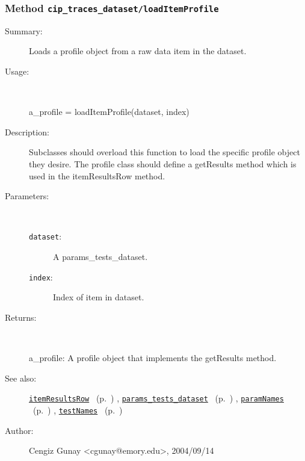 \subsubsection[Method \texttt{loadItemProfile}]{Method \texttt{cip\_traces\_dataset/loadItemProfile}}%
%
\label{ref_cip_traces_dataset__loadItemProfile}%
\hypertarget{ref_cip_traces_dataset__loadItemProfile}{}%
\begin{description}
\item[Summary:]Loads a profile object from a raw data item in the dataset.
%
\item[Usage:]~%
\begin{lyxcode}%
a\_profile = loadItemProfile(dataset, index)
%
\end{lyxcode}%
%
\item[Description:]%
Subclasses should overload this function to load the specific profile
 object they desire. The profile class should define a getResults method
 which is used in the itemResultsRow method.
\item[Parameters:]~
\begin{description}%
\item[\texttt{dataset}:]
 A params\_tests\_dataset.
\item[\texttt{index}:]
 Index of item in dataset.
\end{description}%
%
\item[Returns:
]~

	a\_profile: A profile object that implements the getResults method.
%
%
\item[See also:]%
\hyperlink{ref_itemResultsRow}{\texttt{itemResultsRow}}%
\ (p.~\pageref{ref_itemResultsRow})%
%
, \hyperlink{ref_params_tests_dataset}{\texttt{params\_tests\_dataset}}%
\ (p.~\pageref{ref_params_tests_dataset})%
%
, \hyperlink{ref_paramNames}{\texttt{paramNames}}%
\ (p.~\pageref{ref_paramNames})%
%
, \hyperlink{ref_testNames}{\texttt{testNames}}%
\ (p.~\pageref{ref_testNames})%
%
%
\item[Author:]%
Cengiz Gunay <cgunay@emory.edu>, 2004/09/14
%
\end{description}
\methodline%
